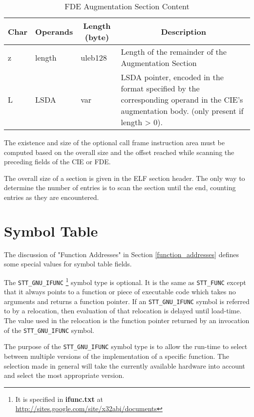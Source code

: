 \begin{table}[H]
\Hrule
\caption{FDE Augmentation Section Content}
\label{format-fdeaug}
\begin{center}
\begin{tabular}{l|p{6em}|l|p{16em}}
  \multicolumn{1}{c}{Char}
         & \multicolumn{1}{c}{Operands}
         & \multicolumn{1}{c}{Length (byte)}
         & \multicolumn{1}{c}{Description} \\ \hline
  z & length & uleb128 & Length of the remainder of the
                                        Augmentation Section \\
  L & LSDA & var & LSDA pointer, encoded in the
                   format specified by the
                   corresponding operand in the CIE's
                   augmentation body. (only present if length > 0). \\
\hline
    \end{tabular}
  \end{center}
\Hrule
\end{table}
The existence and size of the optional call frame instruction area must
be computed
based on the overall size and the offset reached while scanning the
preceding fields of the CIE or FDE.

The overall size of a  section is given in the ELF section
header.  The only way to determine the number of entries is to scan
the section until the end, counting entries as they are encountered.

\section{Symbol Table}

The discussion of "Function Addresses" in Section \ref{function_addresses}
defines some special values for symbol table fields.

The \texttt{STT_GNU_IFUNC}
\footnote{It is specified in {\bf ifunc.txt}
at \url{http://sites.google.com/site/x32abi/documents}}
symbol type is optional. It is the same as
\texttt{STT_FUNC} except that it always points to a function or piece of
executable code which takes no arguments and returns a function pointer.
If an \texttt{STT_GNU_IFUNC} symbol is referred to by a relocation, then
evaluation of that relocation is delayed until load-time.  The value
used in the relocation is the function pointer returned by an invocation
of the \texttt{STT_GNU_IFUNC} symbol.
 
The purpose of the \texttt{STT_GNU_IFUNC} symbol type is to allow the
run-time to select between multiple versions of the implementation of
a specific function.  The selection made in general will take the
currently available hardware into account and select the most
appropriate version.

